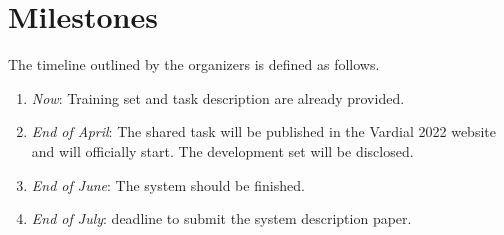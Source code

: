 \documentclass[11pt]{article}
\begin{document}
\section{Milestones}
\label{sec:milestones}
The timeline outlined by the organizers is defined as follows.
\begin{enumerate}
    \item \textit{Now}: Training set and task description are already provided.
    \item \textit{End of April}: The shared task will be published in the Vardial 2022 website and will officially start. The development set will be disclosed.
    \item \textit{End of June}: The system should be finished.
    \item \textit{End of July}: deadline to submit the system description paper.
\end{enumerate}




\end{document}
